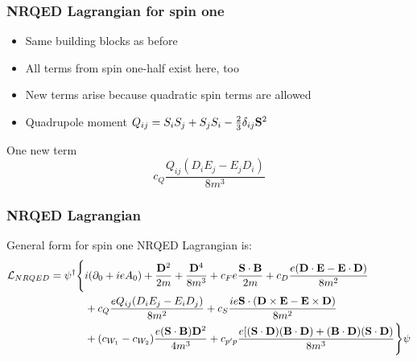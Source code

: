 \documentclass[11ppt]{beamer}
\newcommand{\smalldot}{\cdot}
\newcommand{\beq}{\begin{equation*} }
\newcommand{\eeq}{\end{equation*} }
\begin{document}
\begin{frame}
\frametitle{NRQED Lagrangian for spin one}
\begin{itemize}
  \item Same building blocks as before
  \item All terms from spin one-half exist here, too
  \item New terms arise because quadratic spin terms are allowed
  \item Quadrupole moment $Q_{ij} = S_i S_j + S_j S_i - \frac{2}{3} \delta_{ij} \mathbf{S}^2$
\end{itemize}
One new term
	\beq
		c_Q \frac{ Q_{ij} (D_i E_j - E_j D_i) }{8m^3}
	\eeq
\end{frame}
\begin{frame}
\frametitle{NRQED Lagrangian}
General form for spin one NRQED Lagrangian is:
\footnotesize 
\beq
\begin{split}
	\mathcal{L}_{NRQED} = \psi^\dagger \Bigg \{ & i(\partial_0 + ieA_0) + \frac{\v{D}^2}{2m} + \frac{\v{D}^4}{8m^3} 
		+ c_F e \frac{\v{S} \smalldot \v{B}} {2m}   	
		+ c_D \frac{ e(\v{D} \smalldot \v{E} - \v{E} \smalldot \v{D} ) }{8m^2}	
	\\&	+ c_Q \frac{e Q_{ij} (D_i E_j - E_i D_j) }{8m^2}	
		+ c_S \frac{ ie \v{S} \smalldot ( \v{D} \times \v{E} - \v{E} \times \v{D} )}{8m^2}
	\\&	+ (c_{W_1}- c_{W_2}) \frac{ e  (\v{S} \smalldot \v{B} ) \v{D}^2 }{4m^3}
		+ c_{p' p} \frac{ e [ (\v{S} \smalldot \v{D}) (\v{B} \smalldot \v{D}) + (\v{B} \smalldot \v{D})(\v{S} \smalldot \v{D}) }{8m^3} \Bigg \} \psi
\end{split}
\eeq

\normalsize
\end{frame}
\end{document}
